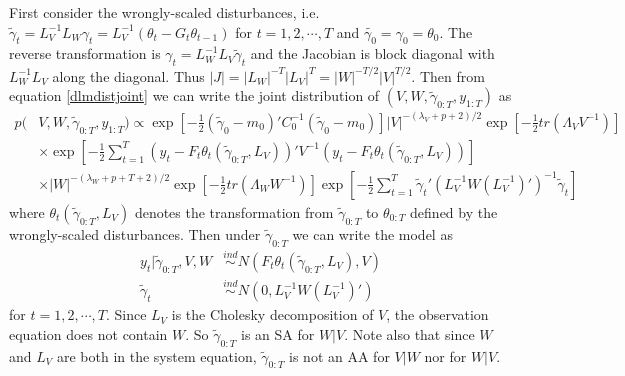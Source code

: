 \documentclass{article}
\begin{document}
First consider the wrongly-scaled disturbances, i.e. $\tilde{\gamma}_t = L_V^{-1}L_W\gamma_t= L_V^{-1}(\theta_t-G_t\theta_{t-1})$ for $t=1,2,\cdots,T$ and $\tilde{\gamma_0}=\gamma_0=\theta_0$. The reverse transformation is $\gamma_t = L_W^{-1}L_V\tilde{\gamma}_t$ and the Jacobian is block diagonal with $L_W^{-1}L_V$ along the diagonal. Thus $|J|=|L_W|^{-T}|L_V|^T=|W|^{-T/2}|V|^{T/2}$. Then from equation \eqref{dlmdistjoint} we can write the joint distribution of $(V,W,\tilde{\gamma}_{0:T},y_{1:T})$ as
 \begin{align}
  p(&V,W,\tilde{\gamma}_{0:T},y_{1:T}) \propto \exp\left[-\frac{1}{2}(\tilde{\gamma}_0-m_0)'C_0^{-1}(\tilde{\gamma}_0-m_0)\right] |V|^{-(\lambda_V + p + 2)/2}\exp\left[-\frac{1}{2}tr\left(\Lambda_VV^{-1}\right)\right]  \nonumber\\
  &\times  \exp\left[-\frac{1}{2}\sum_{t=1}^T\left(y_t - F_t\theta_t(\tilde{\gamma}_{0:T},L_V)\right)'V^{-1}\left(y_t - F_t\theta_t(\tilde{\gamma}_{0:T},L_V)\right)\right]\nonumber\\
   & \times |W|^{-(\lambda_W + p + T + 2)/2}\exp\left[-\frac{1}{2}tr\left(\Lambda_WW^{-1}\right)\right] \exp\left[-\frac{1}{2}\sum_{t=1}^T\tilde{\gamma}_t'(L_V^{-1}W(L_V^{-1})')^{-1}\tilde{\gamma}_t\right]\label{dlmdisttildejoint}
 \end{align}
where $\theta_t(\tilde{\gamma}_{0:T},L_V)$ denotes the transformation from $\tilde{\gamma}_{0:T}$ to $\theta_{0:T}$ defined by the wrongly-scaled disturbances. Then under $\tilde{\gamma}_{0:T}$ we can write the model as
\begin{align*}
  y_t|\tilde{\gamma}_{0:T},V,W & \stackrel{ind}{\sim} N\left(F_t\theta_t(\tilde{\gamma}_{0:T},L_V), V\right)\\
  \tilde{\gamma}_t & \stackrel{ind}{\sim}N(0,L_V^{-1}W(L_V^{-1})')
\end{align*}
for $t=1,2,\cdots,T$. Since $L_V$ is the Cholesky decomposition of $V$, the observation equation does not contain $W$. So $\tilde{\gamma}_{0:T}$ is an SA for $W|V$. Note also that since $W$ and $L_V$ are both in the system equation, $\tilde{\gamma}_{0:T}$ is not an AA for $V|W$ nor for $W|V$. 
\end{document}
